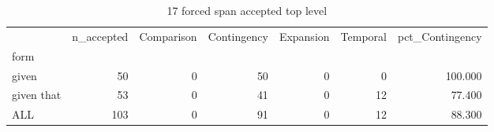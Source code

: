 \begin{table}
\caption{17 forced span accepted top level}
\begin{tabular}{lrrrrrr}
\toprule
 & n\_accepted & Comparison & Contingency & Expansion & Temporal & pct\_Contingency \\
form &  &  &  &  &  &  \\
\midrule
given & 50 & 0 & 50 & 0 & 0 & 100.000 \\
given that & 53 & 0 & 41 & 0 & 12 & 77.400 \\
ALL & 103 & 0 & 91 & 0 & 12 & 88.300 \\
\bottomrule
\end{tabular}
\end{table}
